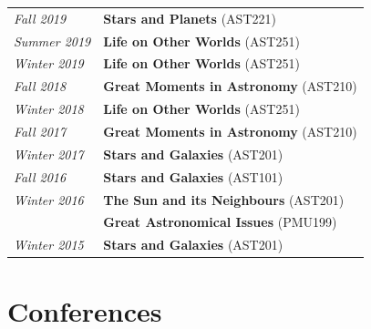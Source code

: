 \documentclass[10pt]{res} %
\begin{document}
\begin{resume}
\begin{table}[h!]
\begin{tabularx}{\textwidth}{lX}
\textit{Fall 2019}      & \textbf{Stars and Planets} (AST221) \\
\textit{Summer 2019} & \textbf{Life on Other Worlds} (AST251) \\
\textit{Winter 2019} & \textbf{Life on Other Worlds} (AST251) \\
\textit{Fall 2018}      & \textbf{Great Moments in Astronomy} (AST210) \\
\textit{Winter 2018} & \textbf{Life on Other Worlds} (AST251) \\
\textit{Fall 2017}      & \textbf{Great Moments in Astronomy} (AST210) \\
\textit{Winter 2017} & \textbf{Stars and Galaxies} (AST201) \\
\textit{Fall 2016} & \textbf{Stars and Galaxies} (AST101) \\
\textit{Winter 2016}  & \textbf{The Sun and its Neighbours} (AST201) \\
                                & \textbf{Great Astronomical Issues} (PMU199) \\
\textit{Winter 2015} & \textbf{Stars and Galaxies} (AST201)
\end{tabularx}
\end{table}


\newpage
\section{\Large Conferences}
\vspace{-5pt} %
\noindent\makebox[\linewidth]{\rule{\textwidth}{0.4pt}}
\vspace{-20pt} %


\end{resume}
\end{document}
